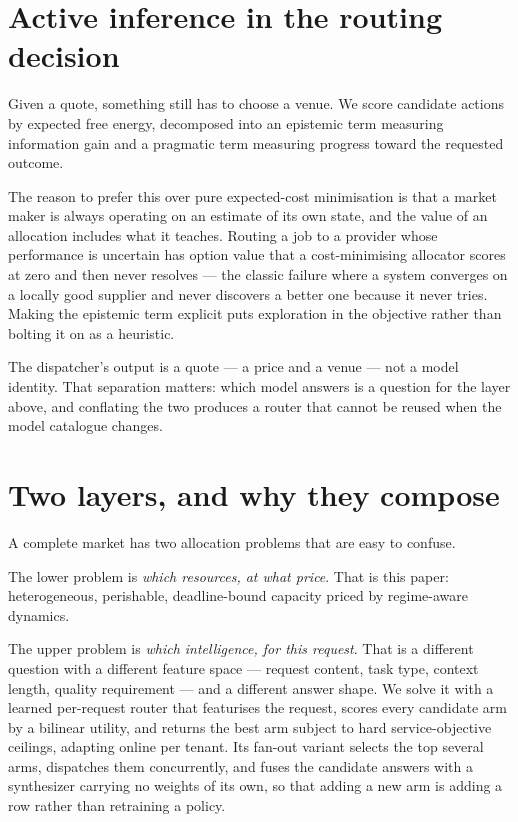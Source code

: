 \documentclass[11pt,a4paper]{article}
\begin{document}
\section{Active inference in the routing decision}

Given a quote, something still has to choose a venue. We score candidate actions
by expected free energy, decomposed into an epistemic term measuring information
gain and a pragmatic term measuring progress toward the requested outcome.

The reason to prefer this over pure expected-cost minimisation is that a market
maker is always operating on an estimate of its own state, and the value of an
allocation includes what it teaches. Routing a job to a provider whose
performance is uncertain has option value that a cost-minimising allocator scores
at zero and then never resolves --- the classic failure where a system converges
on a locally good supplier and never discovers a better one because it never
tries. Making the epistemic term explicit puts exploration in the objective
rather than bolting it on as a heuristic.

The dispatcher's output is a quote --- a price and a venue --- not a model
identity. That separation matters: which model answers is a question for the
layer above, and conflating the two produces a router that cannot be reused when
the model catalogue changes.

\section{Two layers, and why they compose}

A complete market has two allocation problems that are easy to confuse.

The lower problem is \emph{which resources, at what price}. That is this paper:
heterogeneous, perishable, deadline-bound capacity priced by regime-aware
dynamics.

The upper problem is \emph{which intelligence, for this request}. That is a
different question with a different feature space --- request content, task type,
context length, quality requirement --- and a different answer shape. We solve it
with a learned per-request router that featurises the request, scores every
candidate arm by a bilinear utility, and returns the best arm subject to hard
service-objective ceilings, adapting online per tenant. Its fan-out variant
selects the top several arms, dispatches them concurrently, and fuses the
candidate answers with a synthesizer carrying no weights of its own, so that
adding a new arm is adding a row rather than retraining a policy.
\end{document}
